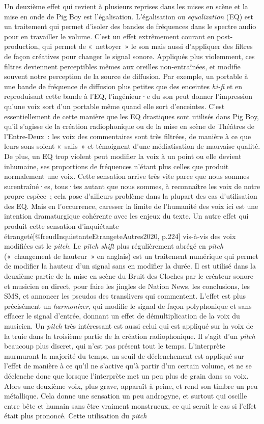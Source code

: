 \documentclass[
]{article}
\begin{document}
Un deuxième effet qui revient à plusieurs reprises dans les mises en scène et la mise en onde de Pig Boy est l'égalisation. L'égalisation ou \emph{equalization} (EQ) est un traitement qui permet d'isoler des bandes de fréquences dans le spectre audio pour en travailler le volume. C'est un effet extrêmement courant en post-production, qui permet de «~nettoyer~» le son mais aussi d'appliquer des filtres de façon créatives pour changer le signal sonore. Appliqués plus violemment, ces filtres deviennent perceptibles mêmes aux oreilles non-entraînées, et modifie souvent notre perception de la source de diffusion. Par exemple, un portable à une bande de fréquence de diffusion plus petites que des enceintes \emph{hi-fi} et en reproduisant cette bande à l'EQ, l'ingénieur·e du son peut donner l'impression qu'une voix sort d'un portable même quand elle sort d'enceintes. C'est essentiellement de cette manière que les EQ drastiques sont utilisés dans Pig Boy, qu'il s'agisse de la création radiophonique ou de la mise en scène de Théâtres de l'Entre-Deux~: les voix des commentaires sont très filtrées, de manière à ce que leurs sons soient «~salis~» et témoignent d'une médiatisation de mauvaise qualité. De plus, un EQ trop violent peut modifier la voix à un point ou elle devient inhumaine, ses proportions de fréquences n'étant plus celles que produit normalement une voix. Cette sensation arrive très vite parce que nous sommes surentraîné·es, tous·tes autant que nous sommes, à reconnaître les voix de notre propre espèce~; cela pose d'ailleurs problème dans la plupart des cas d'utilisation des EQ. Mais en l'occurrence, caresser la limite de l'humanité des voix ici est une intention dramaturgique cohérente avec les enjeux du texte. Un autre effet qui produit cette sensation d'inquiétante étrangeté{[}@freudInquietanteEtrangeteAutres2020, p.224{]} vis-à-vis des voix modifiées est le \emph{pitch}. Le \emph{pitch shift} plus régulièrement abrégé en \emph{pitch} («~changement de hauteur~» en anglais) est un traitement numérique qui permet de modifier la hauteur d'un signal sans en modifier la durée. Il est utilisé dans la deuxième partie de la mise en scène du Bruit des Cloches par le créateur sonore et musicien en direct, pour faire les jingles de Nation News, les conclusions, les SMS, et annoncer les pseudos des translivers qui commentent. L'effet est plus précisément un \emph{harmonizer}, qui modifie le signal de façon polyphonique et sans effacer le signal d'entrée, donnant un effet de démultiplication de la voix du musicien. Un \emph{pitch} très intéressant est aussi celui qui est appliqué sur la voix de la truie dans la troisième partie de la création radiophonique. Il s'agit d'un \emph{pitch} beaucoup plus discret, qui n'est pas présent tout le temps. L'interprète murmurant la majorité du temps, un seuil de déclenchement est appliqué sur l'effet de manière à ce qu'il ne s'active qu'à partir d'un certain volume, et ne se déclenche donc que lorsque l'interprète met un peu plus de grain dans sa voix. Alors une deuxième voix, plus grave, apparaît à peine, et rend son timbre un peu métallique. Cela donne une sensation un peu androgyne, et surtout qui oscille entre bête et humain sans être vraiment monstrueux, ce qui serait le cas si l'effet était plus prononcé. Cette utilisation du \emph{pitch} 
\end{document}

